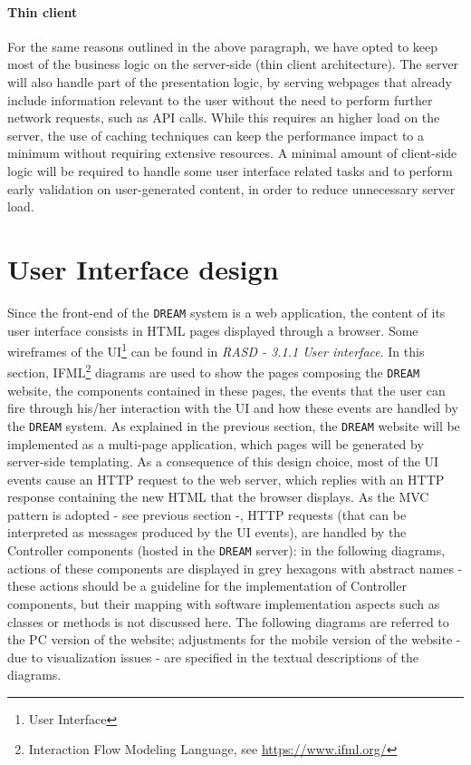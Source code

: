 \documentclass{article}
\begin{document}
\paragraph{Thin client}
For the same reasons outlined in the above paragraph, we have opted to keep most of the business logic on the server-side (thin client architecture). The server will also handle part of the presentation logic, by serving webpages that already include information relevant to the user without the need to perform further network requests, such as API calls. While this requires an higher load on the server, the use of caching techniques can keep the performance impact to a minimum without requiring extensive resources.
A minimal amount of client-side logic will be required to handle some user interface related tasks and to perform early validation on user-generated content, in order to reduce unnecessary server load.

\newpage
\section{User Interface design}
Since the front-end of the \verb|DREAM| system is a web application, the content of its user interface consists in HTML pages displayed through a browser. Some wireframes of the UI\footnote{User Interface} can be found in \textit{RASD - 3.1.1 User interface}. In this section, IFML\footnote{Interaction Flow Modeling Language, see \url{https://www.ifml.org/}} diagrams are used to show the pages composing the \verb|DREAM| website, the components contained in these pages, the events that the user can fire through his/her interaction with the UI and how these events are handled by the \verb|DREAM| system.
As explained in the previous section, the \verb|DREAM| website will be implemented as a multi-page application, which pages will be generated by server-side templating. As a consequence of this design choice, most of the UI events cause an HTTP request to the web server, which replies with an HTTP response containing the new HTML that the browser displays. As the MVC pattern is adopted - see previous section -, HTTP requests (that can be interpreted as messages produced by the UI events), are handled by the Controller components (hosted in the \verb|DREAM| server): in the following diagrams, actions of these components are displayed in grey hexagons with abstract names - these actions should be a guideline for the implementation of Controller components, but their mapping with software implementation aspects such as classes or methods is not discussed here.
The following diagrams are referred to the PC version of the website; adjustments for the mobile version of the website - due to visualization issues - are specified in the textual descriptions of the diagrams.
\end{document}

